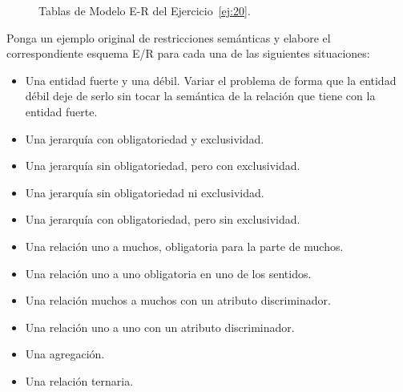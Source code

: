 \begin{ejercicio}
\begin{figure}
{
        }
        \caption{Tablas de Modelo E-R del Ejercicio~\ref{ej:20}.}
        \label{fig:ej20_tablas}
    \end{figure}
\end{ejercicio}

\begin{ejercicio} \label{ej:21}
    Ponga un ejemplo original de restricciones semánticas y elabore el correspondiente esquema E/R para cada
    una de las siguientes situaciones:
    \begin{itemize}
        \item Una entidad fuerte y una débil. Variar el problema de forma que la entidad débil deje de serlo sin tocar
        la semántica de la relación que tiene con la entidad fuerte.
        \item Una jerarquía con obligatoriedad y exclusividad.
        \item Una jerarquía sin obligatoriedad, pero con exclusividad.
        \item Una jerarquía sin obligatoriedad ni exclusividad.
        \item Una jerarquía con obligatoriedad, pero sin exclusividad.
        \item Una relación uno a muchos, obligatoria para la parte de muchos.
        \item Una relación uno a uno obligatoria en uno de los sentidos.
        \item Una relación muchos a muchos con un atributo discriminador.
        \item Una relación uno a uno con un atributo discriminador.
        \item Una agregación.
        \item Una relación ternaria.
    \end{itemize}
\end{ejercicio}
